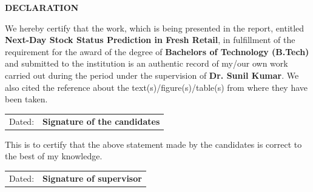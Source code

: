 
\begin{center}
{\Large \bf DECLARATION}
\end{center}
\vspace{0.5cm}
\noindent We hereby certify that the work, which is being presented in the report, entitled \textbf{Next-Day Stock Status Prediction in Fresh Retail}, in fulfillment of the requirement for the award of the degree of \textbf{Bachelors of Technology (B.Tech)} and submitted to the institution is an authentic record of my/our own work carried out during the period under the supervision of \textbf{Dr. Sunil Kumar}. We also cited the reference about the text(s)/figure(s)/table(s) from where they have been taken.

\vspace{1cm}

\begin{center}
	\begin{tabular}{p{}p{}}
		Dated:  & {\bf{Signature of the candidates}} \\	
	\end{tabular}
\end{center}
\vspace{1.5cm}
\noindent This is to certify that the above statement made by the candidates is correct to the best of my knowledge.

\vspace{1.5cm}

\begin{center}
	\begin{tabular}{p{}p{}}
		Dated: & {\bf{Signature of supervisor}} \\	
	\end{tabular}
\end{center}


%
%
%
